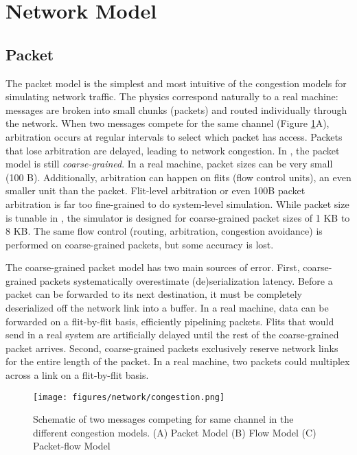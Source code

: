 
\section{Network Model}
\label{sec:tutorial:networkmodel}

\subsection{Packet}
\label{subsec:tutorial:packet}
The packet model is the simplest and most intuitive of the congestion models for simulating network traffic.
The physics correspond naturally to a real machine: messages are broken into small chunks (packets) and routed individually through the network.
When two messages compete for the same channel (Figure \ref{fig:tutorial:congestion}A), arbitration occurs at regular intervals to select which packet has access.
Packets that lose arbitration are delayed, leading to network congestion.
In \sstmacro, the packet model is still \emph{coarse-grained}.
In a real machine, packet sizes can be very small (100 B).
Additionally, arbitration can happen on flits (flow control units), an even smaller unit than the packet.
Flit-level arbitration or even 100B packet arbitration is far too fine-grained to do system-level simulation. 
While packet size is tunable in \sstmacro, the simulator is designed for coarse-grained packet sizes of 1 KB to 8 KB.
The same flow control (routing, arbitration, congestion avoidance) is performed on coarse-grained packets, but some accuracy is lost.

The coarse-grained packet model has two main sources of error.  
First, coarse-grained packets systematically overestimate (de)serialization latency.
Before a packet can be forwarded to its next destination, it must be completely deserialized off the network link into a buffer.
In a real machine, data can be forwarded on a flit-by-flit basis, efficiently pipelining packets.
Flits that would send in a real system are artificially delayed until the rest of the coarse-grained packet arrives.
Second, coarse-grained packets exclusively reserve network links for the entire length of the packet.
In a real machine, two packets could multiplex across a link on a flit-by-flit basis.

\begin{figure}[h]
\centering
\texttt{[image: figures/network/congestion.png]}
\caption{Schematic of two messages competing for same channel in the different \sstmacro congestion models. (A) Packet Model  (B) Flow Model (C) Packet-flow Model }
\label{fig:tutorial:congestion}
\end{figure}

